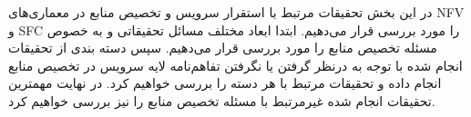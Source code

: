 
در این بخش تحقیقات مرتبط با استقرار سرویس و تخصیص منابع در معماری‌های NFV و SFC را مورد بررسی قرار می‌دهیم.
ابتدا ابعاد مختلف مسائل تحقیقاتی و به خصوص مسئله تخصیص منابع را مورد بررسی قرار می‌دهیم.
سپس دسته بندی از تحقیقات انجام شده با توجه به درنظر گرفتن یا نگرفتن تفاهم‌نامه لایه سرویس در تخصیص منابع انجام داده و تحقیقات مرتبط با هر دسته را بررسی خواهیم کرد. در نهایت مهمترین تحقیقات انجام شده غیرمرتبط با مسئله تخصیص منابع را نیز بررسی خواهیم کرد.
